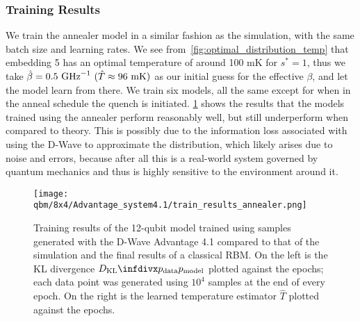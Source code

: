 \subsubsection{Training Results}
We train the annealer model in a similar fashion as the simulation, with the same batch size and learning rates.
We see from~\cref{fig:optimal_distribution_temp} that embedding 5 has an optimal temperature of around 100 \si{\milli\kelvin} for \( s^* = 1 \), thus we take \( \betahat = 0.5 \ \si{\giga\hertz}^{-1} \ (\hat{T} \approx 96 \ \si{\milli\kelvin}) \) as our initial guess for the effective \( \beta \), and let the model learn from there.
We train six models, all the same except for when in the anneal schedule the quench is initiated.
\cref{fig:train_results_annealer} shows the results that the models trained using the annealer perform reasonably well, but still underperform when compared to theory.
This is possibly due to the information loss associated with using the D-Wave to approximate the distribution, which likely arises due to noise and errors, because after all this is a real-world system governed by quantum mechanics and thus is highly sensitive to the environment around it.
\begin{figure}[!htb]
    \begin{center}
        \texttt{[image: qbm/8x4/Advantage\_system4.1/train\_results\_annealer.png]}
    \end{center}
    \caption{
        Training results of the 12-qubit model trained using samples generated with the D-Wave Advantage 4.1 compared to that of the simulation and the final results of a classical RBM.
        On the left is the KL divergence \( \DKL{\pdata}{\pmodel} \) plotted against the epochs; each data point was generated using \( 10^4 \) samples at the end of every epoch.
        On the right is the learned temperature estimator \( \hat{T} \) plotted against the epochs.
    }
    \label{fig:train_results_annealer}
\end{figure}
